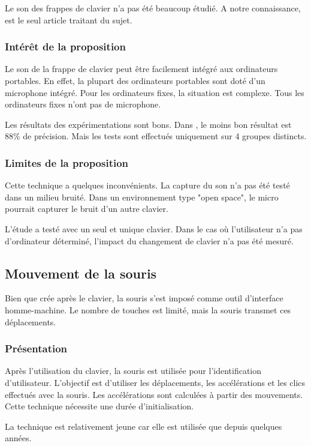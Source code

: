 \documentclass[conference,compsoc]{IEEEtran}
\begin{document}
Le son des frappes de clavier n'a pas été beaucoup étudié. A notre connaissance, \cite{7477360} est le seul article traitant du sujet.

\subsubsection{Intérêt de la proposition}
Le son de la frappe de clavier peut être facilement intégré aux ordinateurs portables. En effet, la plupart des ordinateurs portables sont doté d'un microphone intégré. Pour les ordinateurs fixes, la situation est complexe. Tous les ordinateurs fixes n'ont pas de microphone.

Les résultats des expérimentations sont bons. Dans \cite{7477360}, le moins bon résultat est 88\% de précision. Mais les tests sont effectués uniquement sur 4 groupes distincts.

\subsubsection{Limites de la proposition}
Cette technique a quelques inconvénients. La capture du son n'a pas été testé dans un milieu bruité. Dans un environnement type "open space", le micro pourrait capturer le bruit d'un autre clavier.

L'étude \cite{7477360} a testé avec un seul et unique clavier. Dans le cas où l'utilisateur n'a pas d'ordinateur déterminé, l'impact du changement de clavier n'a pas été mesuré.

\subsection{Mouvement de la souris} %
Bien que crée après le clavier, la souris s'est imposé comme outil d'interface homme-machine. Le nombre de touches est limité, mais la souris transmet ces déplacements.

\subsubsection{Présentation}
Après l'utilisation du clavier, la souris est utilisée pour l'identification d'utilisateur. L'objectif est d'utiliser les déplacements, les accélérations et les clics effectués avec la souris.
Les accélérations sont calculées à partir des mouvements. Cette technique nécessite une durée d'initialisation.

La technique est relativement jeune car elle est utilisée que depuis quelques années.
\end{document}
